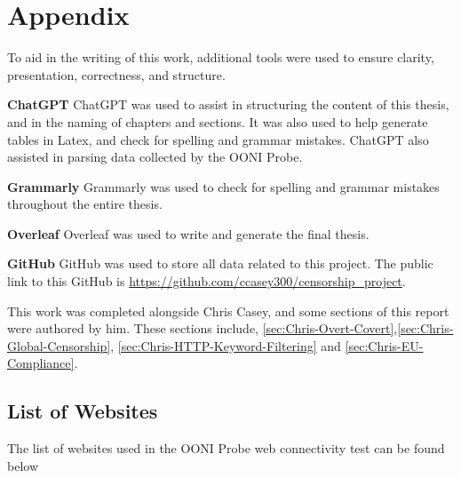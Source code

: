 \chapter{Appendix}

To aid in the writing of this work, additional tools were used to ensure clarity, presentation, correctness, and structure.

\textbf{ChatGPT} ChatGPT was used to assist in structuring the content of this thesis, and in the naming of chapters and sections. It was also used to help generate tables in Latex, and check for spelling and grammar mistakes. ChatGPT also assisted in parsing data collected by the OONI Probe.

\textbf{Grammarly} Grammarly was used to check for spelling and grammar mistakes throughout the entire thesis.

\textbf{Overleaf} Overleaf was used to write and generate the final thesis.

\textbf{GitHub} GitHub was used to store all data related to this project. The public link to this GitHub is \url{https://github.com/ccasey300/censorship_project}.

This work was completed alongside Chris Casey, and some sections of this report were authored by him. These sections include, \ref{sec:Chris-Overt-Covert},\ref{sec:Chris-Global-Censorship}, \ref{sec:Chris-HTTP-Keyword-Filtering} and \ref{sec:Chris-EU-Compliance}.

\section{List of Websites}

The list of websites used in the OONI Probe web connectivity test can be found below

